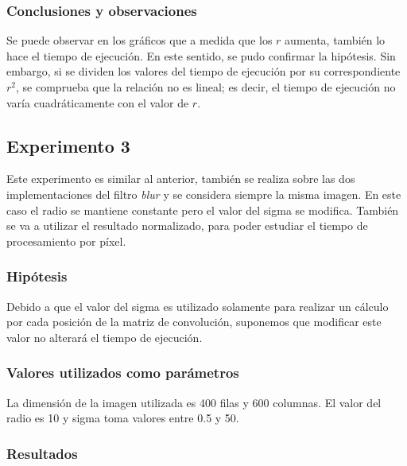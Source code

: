 		\subsubsection{Conclusiones y observaciones}
			Se puede observar en los gráficos que a medida que los $r$ aumenta, también lo hace el tiempo de ejecución. En este sentido, se pudo confirmar la hipótesis. Sin embargo, si se dividen los valores del tiempo de ejecución por su correspondiente $r^2$, se comprueba que la relación no es lineal; es decir, el tiempo de ejecución no varía cuadráticamente con el valor de $r$.


	\subsection{Experimento 3}
		Este experimento es similar al anterior, también se realiza sobre las dos implementaciones del filtro \emph{blur} y se considera siempre la misma imagen. En este caso el radio se mantiene constante pero el valor del sigma se modifica. También se va a utilizar el resultado normalizado, para poder estudiar el tiempo de procesamiento por píxel. 

			\subsubsection*{Hipótesis} 
				Debido a que el valor del sigma es utilizado solamente para realizar un cálculo por cada posición de la matriz de convolución, suponemos que modificar este valor no alterará el tiempo de ejecución.

			\subsubsection*{Valores utilizados como parámetros} 
			La dimensión de la imagen utilizada es 400 filas y 600 columnas. El valor del radio es 10 y sigma toma valores entre 0.5 y 50.

			\subsubsection*{Resultados}

